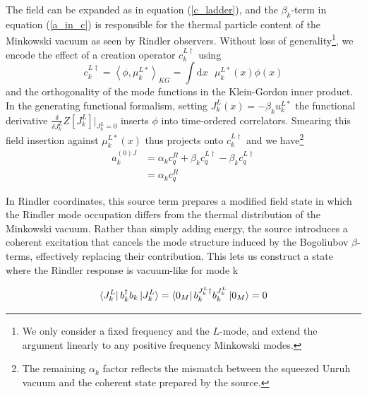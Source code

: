 \documentclass[12pt,a4paper]{article}
\newcommand{\dv}[1]{\mathrm{d} #1 \text{ }}
\begin{document}
The field can be expanded as in equation (\ref{c_ladder}), and the $\beta_k$-term in equation (\ref{a_in_c}) is responsible for the thermal particle content of the Minkowski vacuum as seen by Rindler observers. Without loss of generality\footnote{We only consider a fixed frequency and the $L$-mode, and extend the argument linearly to any positive frequency Minkowski modes.}, we encode the effect of a creation operator $c_k^{L \dagger}$ using
\begin{equation}
  c _k^{L\dagger} = \left<\phi, \mu_k^{L*}\right>_{KG} = \int \dv{x} \mu_k^{L*}(x) \phi(x)
\end{equation}
and the orthogonality of the mode functions in the Klein-Gordon inner product. In the generating functional formalism, setting $J_k^L(x) = -\beta_k u_k^{L*}$ the functional derivative $\frac{\delta}{\delta J_k^L}Z[J_k^L]|_{J_k^L=0}$ inserts $\phi$ into time-ordered correlators. Smearing this field insertion against $\mu_k^{L*}(x)$ thus projects onto $c_k^{L\dagger}$ and we have\footnote{The remaining $\alpha_k$ factor reflects the mismatch between the squeezed Unruh vacuum and the coherent state prepared by the source.}
\begin{equation}
\begin{array}{ll}
  a_k^{(0)J} &= \alpha_k c_q^R + \beta_k c_q^{L\dagger} -  \beta_k c_q^{L\dagger} \\
  &= \alpha_k c_q^R
\end{array}
\end{equation}

In Rindler coordinates, this source term prepares a modified field state in which the Rindler mode occupation differs from the thermal distribution of the Minkowski vacuum. Rather than simply adding energy, the source introduces a coherent excitation that cancels the mode structure induced by the Bogoliubov $\beta$-terms, effectively replacing their contribution. This lets us construct a state where the Rindler response is vacuum-like for mode k

\begin{equation}
  \bra{J_k^L}  b_k^{\dagger} b_k \ket{J_k^L} = \bra{0_M}  b_k^{J_k^L \dagger} b^{J_k^L}_k \ket{0_M} = 0
\end{equation}
\end{document}
